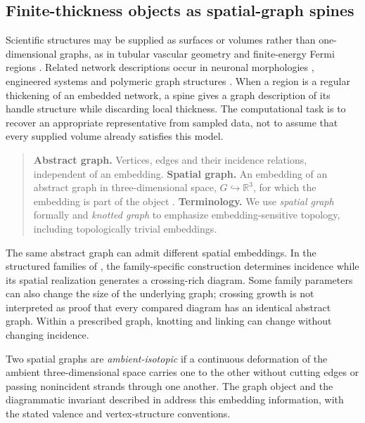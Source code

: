 \documentclass[10pt,twocolumn]{article}
\begin{document}
\subsection{Finite-thickness objects as spatial-graph spines}
\label{supp:handlebody_basis}
Scientific structures may be supplied as surfaces or volumes rather than one-dimensional graphs, as in tubular vascular geometry \cite{kg_aylward2005spatial_vascular} and finite-energy Fermi regions \cite{akgun_yan_2026topologicalclassificationknottedgraphs}. Related network descriptions occur in neuronal morphologies \cite{kg_cuntz2010neuronal_graphs}, engineered systems \cite{kg_shai1999engineering_graphs,kg_peddada2023} and polymeric graph structures \cite{kg_deguchi2017topological_polymers}. When a region is a regular thickening of an embedded network, a spine gives a graph description of its handle structure while discarding local thickness. The computational task is to recover an appropriate representative from sampled data, not to assume that every supplied volume already satisfies this model.

\begin{quote}
\textbf{Abstract graph.} Vertices, edges and their incidence relations, independent of an embedding.
\medskip
\noindent\textbf{Spatial graph.} An embedding of an abstract graph in three-dimensional space, $G\hookrightarrow\mathbb R^3$, for which the embedding is part of the object \cite{kg_kauffman1989spatial,kg_flapan2017spatial}.
\medskip
\noindent\textbf{Terminology.} We use \emph{spatial graph} formally and \emph{knotted graph} to emphasize embedding-sensitive topology, including topologically trivial embeddings.
\end{quote}

The same abstract graph can admit different spatial embeddings. In the structured families of , the family-specific construction determines incidence while its spatial realization generates a crossing-rich diagram. Some family parameters can also change the size of the underlying graph; crossing growth is not interpreted as proof that every compared diagram has an identical abstract graph. Within a prescribed graph, knotting and linking can change without changing incidence.

Two spatial graphs are \emph{ambient-isotopic} if a continuous deformation of the ambient three-dimensional space carries one to the other without cutting edges or passing nonincident strands through one another. The graph object and the diagrammatic invariant described in  address this embedding information, with the stated valence and vertex-structure conventions.
\end{document}
